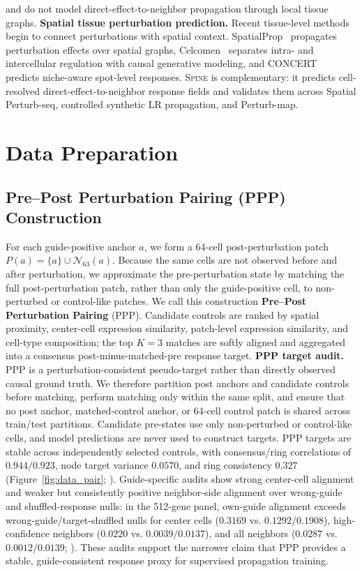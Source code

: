\documentclass[sigconf,review,balance=false]{acmart}
\newcommand{\methodname}{\textsc{Spine}\xspace}
\begin{document}
and do not model direct-effect-to-neighbor propagation through local tissue graphs.
\textbf{Spatial tissue perturbation prediction.}
Recent tissue-level methods begin to connect perturbations with spatial context.
SpatialProp~\citep{spatialprop2025} propagates perturbation effects over spatial
graphs, Celcomen~\citep{celcomen2026} separates intra- and intercellular regulation
with causal generative modeling, and CONCERT~\citep{concert2025} predicts
niche-aware spot-level responses. \methodname{} is complementary: it predicts
cell-resolved direct-effect-to-neighbor response fields and validates them across
Spatial Perturb-seq, controlled synthetic LR propagation, and Perturb-map.








\section{Data Preparation}
\label{sec:data_construction}
\subsection{Pre--Post Perturbation Pairing (PPP) Construction}
For each guide-positive anchor $a$, we form a 64-cell post-perturbation patch $P(a)=\{a\}\cup\mathcal{N}_{63}(a)$. Because the same cells are not observed before and after perturbation, we approximate the pre-perturbation state by matching the full post-perturbation patch, rather than only the guide-positive cell, to non-perturbed or control-like patches. We call this construction \textbf{Pre--Post Perturbation Pairing} (PPP). Candidate controls are ranked by spatial proximity, center-cell expression similarity, patch-level expression similarity, and cell-type composition; the top $K=3$ matches are softly aligned and aggregated into a consensus post-minus-matched-pre response target. \textbf{PPP target audit.}
PPP is a perturbation-consistent pseudo-target rather than directly observed causal ground truth. We therefore partition post anchors and candidate controls before matching, perform matching only within the same split, and ensure that no post anchor, matched-control anchor, or 64-cell control patch is shared across train/test partitions. Candidate pre-states use only non-perturbed or control-like cells, and model predictions are never used to construct targets. PPP targets are stable across independently selected controls, with consensus/ring correlations of $0.944/0.923$, node target variance $0.0570$, and ring consistency $0.327$ (Figure~\ref{fig:data_pair}; ). Guide-specific audits show strong center-cell alignment and weaker but consistently positive neighbor-side alignment over wrong-guide and shuffled-response nulls: in the 512-gene panel, own-guide alignment exceeds wrong-guide/target-shuffled nulls for center cells ($0.3169$ vs. $0.1292/0.1908$), high-confidence neighbors ($0.0220$ vs. $0.0039/0.0137$), and all neighbors ($0.0287$ vs. $0.0012/0.0139$; ). These audits support the narrower claim that PPP provides a stable, guide-consistent response proxy for supervised propagation training.
\end{document}
